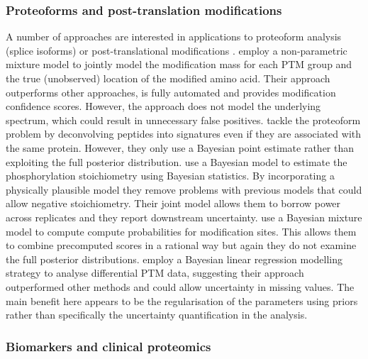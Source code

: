 \documentclass[12pt,english]{article}
\begin{document}
\subsubsection{Proteoforms and post-translation modifications}
A number of approaches are interested in applications to proteoform analysis (splice isoforms) or post-translational modifications \citep{Chung::2013, Webb::2014, Lim::2017, Shteynberg::2019, Mallikarun::2020}. \citet{Chung::2013} employ a non-parametric mixture model to jointly model the modification mass for each PTM group and the true (unobserved) location of the modified amino acid. Their approach outperforms other approaches, is fully automated and provides modification confidence scores. However, the approach does not model the underlying spectrum, which could result in unnecessary false positives. \citet{Webb::2014} tackle the proteoform problem by deconvolving peptides into signatures even if they are associated with the same protein. However, they only use a Bayesian point estimate rather than exploiting the full posterior distribution. \citet{Lim::2017} use a Bayesian model to estimate the phosphorylation stoichiometry using Bayesian statistics. By incorporating a physically plausible model they remove problems with previous models that could allow negative stoichiometry. Their joint model allows them to borrow power across replicates and they report downstream uncertainty. \citet{Shteynberg::2019} use a Bayesian mixture model to compute compute probabilities for modification sites. This allows them to combine precomputed scores in a rational way but again they do not examine the full posterior distributions. \citet{Mallikarun::2020} employ a Bayesian linear regression modelling strategy to analyse differential PTM data, suggesting their approach outperformed other methods and could allow uncertainty in missing values. The main benefit here appears to be the regularisation of the parameters using priors rather than specifically the uncertainty quantification in the analysis.

\subsubsection{Biomarkers and clinical proteomics}
\end{document}
